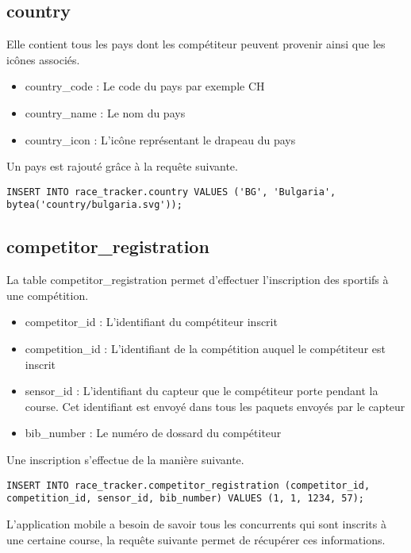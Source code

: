 \subsection{country}

Elle contient tous les pays dont les compétiteur peuvent provenir ainsi que les icônes associés.

\begin{itemize}
\item country\_code : Le code du pays par exemple CH
\item country\_name : Le nom du pays
\item country\_icon :  L'icône représentant le drapeau du pays
\end{itemize}

Un pays est rajouté grâce à la requête suivante.

\begin{lstlisting}[style=SQLStyle]
INSERT INTO race_tracker.country VALUES ('BG', 'Bulgaria', bytea('country/bulgaria.svg'));
\end{lstlisting}

\subsection{competitor\_registration}

La table competitor\_registration permet d'effectuer l'inscription des sportifs à une compétition.

\begin{itemize}
\item competitor\_id : L'identifiant du compétiteur inscrit
\item competition\_id : L'identifiant de la compétition auquel le compétiteur est inscrit
\item sensor\_id : L'identifiant du capteur que le compétiteur porte pendant la course. Cet identifiant est envoyé dans tous les paquets envoyés par le capteur
\item bib\_number : Le numéro de dossard du compétiteur
\end{itemize}

Une inscription s'effectue de la manière suivante.

\begin{lstlisting}[style=SQLStyle]
INSERT INTO race_tracker.competitor_registration (competitor_id, competition_id, sensor_id, bib_number) VALUES (1, 1, 1234, 57);
\end{lstlisting}

L'application mobile a besoin de savoir tous les concurrents qui sont inscrits à une certaine course, la requête suivante permet de récupérer ces informations.

